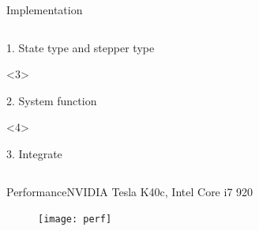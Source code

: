 \documentclass[@BEAMER_OPTIONS@]{beamer}
\begin{document}
\begin{frame}[fragile]{Implementation}
\begin{columns}
\begin{column}[c]{0.62\textwidth}
\begin{onlyenv}
\begin{exampleblock}{1. State type and stepper type}
\begin{adjustbox}{width=0.75\textwidth, height=\textheight, keepaspectratio}
\begin{minipage}{\textwidth}
                        \end{minipage}
                    \end{adjustbox}
                \end{exampleblock}
            \end{onlyenv}
            \begin{onlyenv}<3>
                \begin{exampleblock}{2. System function}
                    \begin{adjustbox}{width=0.75\textwidth, height=\textheight, keepaspectratio}
                        \begin{minipage}{\textwidth}
                            
                        \end{minipage}
                    \end{adjustbox}
                \end{exampleblock}
            \end{onlyenv}
            \begin{onlyenv}<4>
                \begin{exampleblock}{3. Integrate}
                    \begin{adjustbox}{width=0.75\textwidth, height=\textheight, keepaspectratio}
                        \begin{minipage}{\textwidth}
                            
                        \end{minipage}
                    \end{adjustbox}
                \end{exampleblock}
            \end{onlyenv}
        \end{column}
    \end{columns}
\end{frame}

\begin{frame}[fragile]{Performance}{NVIDIA Tesla K40c, Intel Core i7 920}
    \begin{figure}
        \texttt{[image: perf]}
    \end{figure}
\end{frame}
\end{document}
